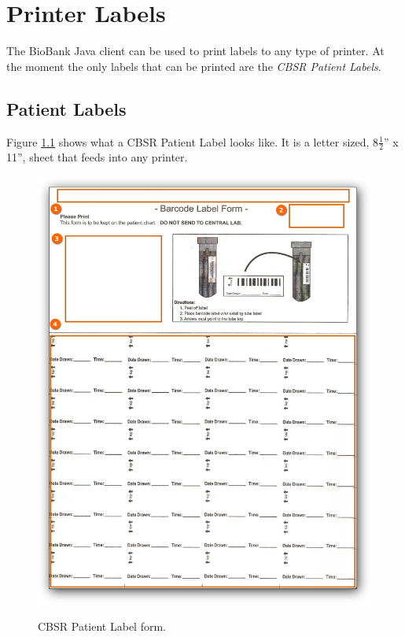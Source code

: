 \chapter{Printer Labels}
\label{chap:printer_labels}

The BioBank Java client can be used to print labels to any type of printer. At
the moment the only labels that can be printed are the \emph{CBSR Patient
  Labels}.

\section{Patient Labels}
\label{sec:printer_labels}

Figure \ref{fig:cbsr_patient_label} shows what a CBSR Patient Label looks
like. It is a letter sized, 8$\frac{1}{2}$'' x 11'', sheet that feeds into any
printer.

    \begin{figure}[H]
      \centering
      \scalebox{0.35}
      { \includegraphics*{screenshots/printer_labels/01_cbsr_patient_label_sheet} }
      \caption{CBSR Patient Label form.}
      \label{fig:cbsr_patient_label}
    \end{figure}

